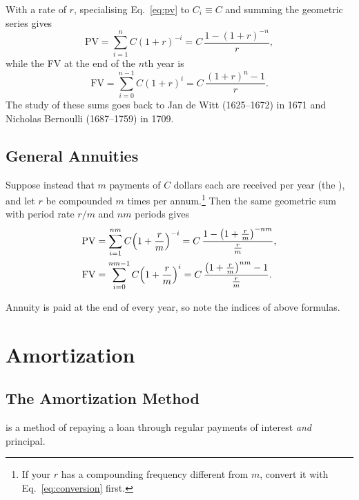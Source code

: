 With a rate of $r$, specialising Eq.~\eqref{eq:pv} to $C_{i} \equiv C$ and summing the geometric series gives
\[
	\mathrm{PV} = \sum_{i=1}^{n} C(1+r)^{-i}
	= C\,\frac{1-(1+r)^{-n}}{r} ,
\]
while the FV at the end of the $n$th year is
\[
	\mathrm{FV} = \sum_{i=0}^{n-1} C(1+r)^{i}
	= C\,\frac{(1+r)^{n}-1}{r} .
\]
The study of these sums goes back to Jan de Witt (1625--1672) in 1671 and Nicholas Bernoulli (1687--1759) in 1709.

\subsection{General Annuities}

Suppose instead that $m$ payments of $C$ dollars each are received per year (the ), and let $r$ be compounded $m$ times per annum.\footnote{If your $r$ has a compounding frequency different from $m$, convert it with Eq.~\eqref{eq:conversion} first.} Then the same geometric sum with period rate $r/m$ and $nm$ periods gives
\begin{align}
	\mathrm{PV} & = \sum_{i=1}^{nm} C\Bigl(1+\frac{r}{m}\Bigr)^{-i}
	= C\,\frac{1-\bigl(1+\frac{r}{m}\bigr)^{-nm}}{\frac{r}{m}},
	\label{eq:gen-annuity}                                             \\
	\mathrm{FV} & = \sum_{i=0}^{nm-1} C\Bigl(1+\frac{r}{m}\Bigr)^{i}
	= C\,\frac{\bigl(1+\frac{r}{m}\bigr)^{nm}-1}{\frac{r}{m}} . \nonumber
\end{align}

\suppstart
\begin{remark}
    Annuity is paid at the end of every year, so note the indices of above formulas.
\end{remark}
\suppend

\section{Amortization}


\subsection{The Amortization Method}

\begin{definition}
	 is a method of repaying a loan through regular payments of interest \emph{and} principal.
\end{definition}


